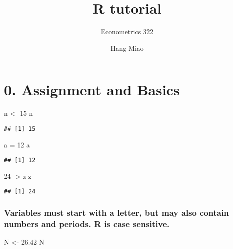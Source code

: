 \documentclass[]{article}
\title{R tutorial}
\subtitle{Econometrics 322}
\author{Hang Miao}
\date{}
\newenvironment{Shaded}{\begin{snugshade}}{\end{snugshade}}
\newcommand{\DecValTok}[1]{\textcolor[rgb]{0.00,0.00,0.81}{#1}}
\newcommand{\FloatTok}[1]{\textcolor[rgb]{0.00,0.00,0.81}{#1}}
\newcommand{\StringTok}[1]{\textcolor[rgb]{0.31,0.60,0.02}{#1}}
\newcommand{\NormalTok}[1]{#1}
\begin{document}
\maketitle

\section{\texorpdfstring{0. \textbf{Assignment and
Basics}}{0. Assignment and Basics}}\label{assignment-and-basics}

\begin{Shaded}
\begin{Highlighting}[]
\NormalTok{n <-}\StringTok{ }\DecValTok{15}
\NormalTok{n}
\end{Highlighting}
\end{Shaded}

\begin{verbatim}
## [1] 15
\end{verbatim}

\begin{Shaded}
\begin{Highlighting}[]
\NormalTok{a =}\StringTok{ }\DecValTok{12}
\NormalTok{a}
\end{Highlighting}
\end{Shaded}

\begin{verbatim}
## [1] 12
\end{verbatim}

\begin{Shaded}
\begin{Highlighting}[]
\DecValTok{24}\NormalTok{ ->}\StringTok{ }\NormalTok{z}
\NormalTok{z}
\end{Highlighting}
\end{Shaded}

\begin{verbatim}
## [1] 24
\end{verbatim}

\subsubsection{Variables must start with a letter, but may also contain
numbers and periods. R is case
sensitive.}\label{variables-must-start-with-a-letter-but-may-also-contain-numbers-and-periods.-r-is-case-sensitive.}

\begin{Shaded}
\begin{Highlighting}[]
\NormalTok{N <-}\StringTok{ }\FloatTok{26.42}
\NormalTok{N}
\end{Highlighting}
\end{Shaded}
\end{document}
